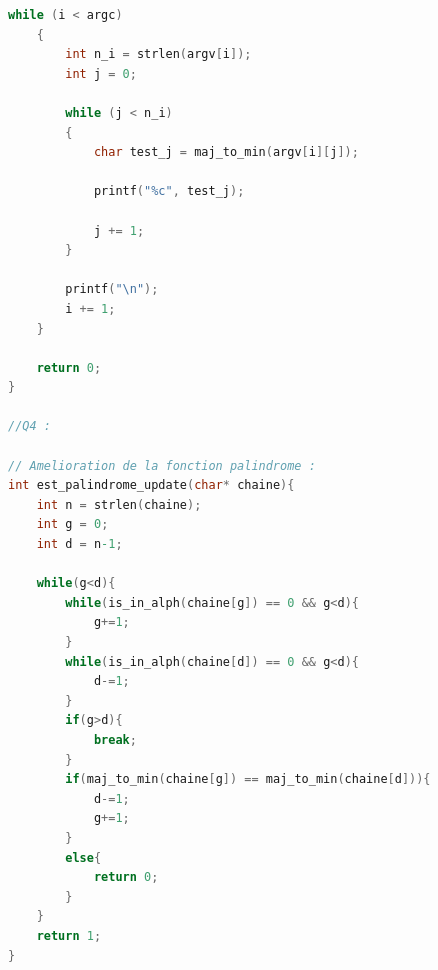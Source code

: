 \documentclass{article}
\begin{document}
\begin{lstlisting}[language=C, caption={Implémentationdes fonctions \textit{palindrome, isalpha, tolower}}]
    while (i < argc)
    {
        int n_i = strlen(argv[i]);
        int j = 0;

        while (j < n_i)
        {
            char test_j = maj_to_min(argv[i][j]);

            printf("%c", test_j);

            j += 1;
        }

        printf("\n");
        i += 1;
    }

    return 0;
}

//Q4 : 

// Amelioration de la fonction palindrome : 
int est_palindrome_update(char* chaine){
    int n = strlen(chaine); 
    int g = 0;
    int d = n-1;

    while(g<d){
        while(is_in_alph(chaine[g]) == 0 && g<d){
            g+=1;
        }
        while(is_in_alph(chaine[d]) == 0 && g<d){
            d-=1;
        }
        if(g>d){
            break;
        }
        if(maj_to_min(chaine[g]) == maj_to_min(chaine[d])){
            d-=1;
            g+=1;
        }
        else{
            return 0;
        }
    }
    return 1;
}


\end{lstlisting}
\end{document}
